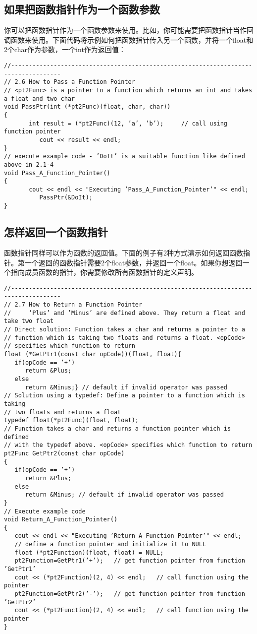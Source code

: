 \documentclass[11pt,a4paper]{article}
\begin{document}
\subsection{如果把函数指针作为一个函数参数}
你可以把函数指针作为一个函数参数来使用。比如，你可能需要把函数指针当作回调函数来使用。下面代码将示例如何把函数指针传入另一个函数，并将一个float和2个char作为参数，一个int作为返回值：
\begin{lstlisting}
//------------------------------------------------------------------------------------
// 2.6 How to Pass a Function Pointer
// <pt2Func> is a pointer to a function which returns an int and takes a float and two char
void PassPtr(int (*pt2Func)(float, char, char))
{
       int result = (*pt2Func)(12, ’a’, ’b’);     // call using function pointer
          cout << result << endl;
}
// execute example code - ’DoIt’ is a suitable function like defined above in 2.1-4
void Pass_A_Function_Pointer()
{
       cout << endl << "Executing ’Pass_A_Function_Pointer’" << endl;
          PassPtr(&DoIt);
}
\end{lstlisting}
\subsection{怎样返回一个函数指针}
函数指针同样可以作为函数的返回值。下面的例子有2种方式演示如何返回函数指针。第一个返回的函数指针需要2个float参数，并返回一个float。如果你想返回一个指向成员函数的指针，你需要修改所有函数指针的定义声明。
\begin{lstlisting}
//------------------------------------------------------------------------------------
// 2.7 How to Return a Function Pointer
//     ’Plus’ and ’Minus’ are defined above. They return a float and take two float
// Direct solution: Function takes a char and returns a pointer to a
// function which is taking two floats and returns a float. <opCode>
// specifies which function to return
float (*GetPtr1(const char opCode))(float, float){
   if(opCode == ’+’)
      return &Plus;
   else
      return &Minus;} // default if invalid operator was passed
// Solution using a typedef: Define a pointer to a function which is taking
// two floats and returns a float
typedef float(*pt2Func)(float, float);
// Function takes a char and returns a function pointer which is defined
// with the typedef above. <opCode> specifies which function to return
pt2Func GetPtr2(const char opCode)
{
   if(opCode == ’+’)
      return &Plus;
   else
      return &Minus; // default if invalid operator was passed
}
// Execute example code
void Return_A_Function_Pointer()
{
   cout << endl << "Executing ’Return_A_Function_Pointer’" << endl;
   // define a function pointer and initialize it to NULL
   float (*pt2Function)(float, float) = NULL;
   pt2Function=GetPtr1(’+’);   // get function pointer from function ’GetPtr1’
   cout << (*pt2Function)(2, 4) << endl;   // call function using the pointer
   pt2Function=GetPtr2(’-’);   // get function pointer from function ’GetPtr2’
   cout << (*pt2Function)(2, 4) << endl;   // call function using the pointer
}
\end{lstlisting}
\end{document}
